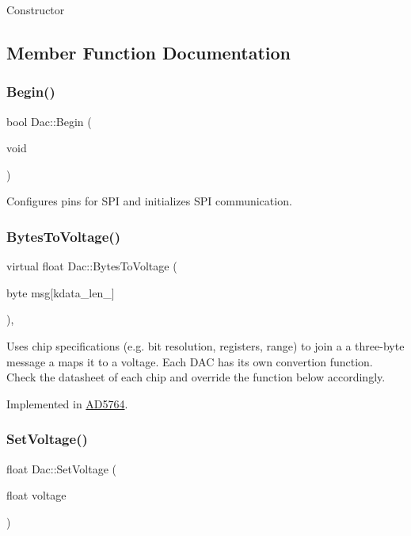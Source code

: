 Constructor 

\subsection{Member Function Documentation}
\mbox{\label{classDac_ad88e0048e59c0633b72769ddb8337e49}} 
\subsubsection{\texorpdfstring{Begin()}{Begin()}}
{\footnotesize\ttfamily bool Dac\+::\+Begin (\begin{DoxyParamCaption}\item[{void}]{ }\end{DoxyParamCaption})}

Configures pins for S\+PI and initializes S\+PI communication. \mbox{\label{classDac_a1dc9be97cb41ddacbd8dde0c5d4243b4}} 
\subsubsection{\texorpdfstring{Bytes\+To\+Voltage()}{BytesToVoltage()}}
{\footnotesize\ttfamily virtual float Dac\+::\+Bytes\+To\+Voltage (\begin{DoxyParamCaption}\item[{byte}]{msg\mbox{[}kdata\+\_\+len\+\_\+\mbox{]} }\end{DoxyParamCaption})\hspace{0.3cm}{\ttfamily [protected]}, {}}

Uses chip specifications (e.\+g. bit resolution, registers, range) to join a a three-\/byte message a maps it to a voltage. Each D\+AC has its own convertion function. Check the datasheet of each chip and override the function below accordingly. 

Implemented in \mbox{\hyperlink{classAD5764_a8f2845c7dd6b8984e7b85c35e50bbb66}{A\+D5764}}.

\mbox{\label{classDac_a71ede236baa8fc67d18db38629e6c225}} 
\subsubsection{\texorpdfstring{Set\+Voltage()}{SetVoltage()}}
{\footnotesize\ttfamily float Dac\+::\+Set\+Voltage (\begin{DoxyParamCaption}\item[{float}]{voltage }\end{DoxyParamCaption})}

